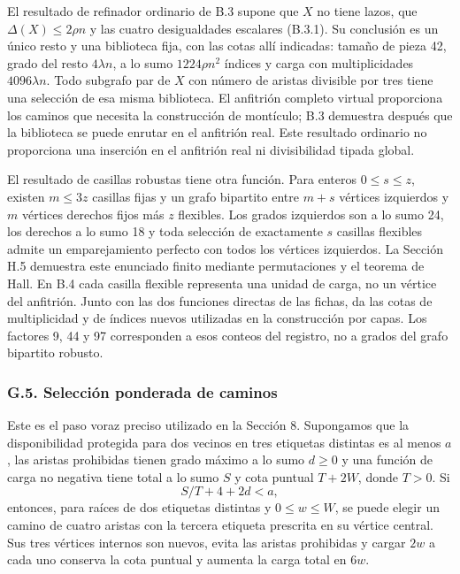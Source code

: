 \documentclass[spanish,11pt,a4paper]{article}
\begin{document}
El resultado de refinador ordinario de B.3 supone que \(X\) no tiene lazos, que \(\Delta(X)\le2\rho n\) y las cuatro desigualdades escalares (B.3.1). Su conclusión es un único resto y una biblioteca fija, con las cotas allí indicadas: tamaño de pieza 42, grado del resto \(4\lambda n\), a lo sumo \(1224\rho n^2\) índices y carga con multiplicidades \(4096\lambda n\). Todo subgrafo par de \(X\) con número de aristas divisible por tres tiene una selección de esa misma biblioteca. El anfitrión completo virtual proporciona los caminos que necesita la construcción de montículo; B.3 demuestra después que la biblioteca se puede enrutar en el anfitrión real. Este resultado ordinario no proporciona una inserción en el anfitrión real ni divisibilidad tipada global.

El resultado de casillas robustas tiene otra función. Para enteros \(0\le s\le z\), existen \(m\le3z\) casillas fijas y un grafo bipartito entre \(m+s\) vértices izquierdos y \(m\) vértices derechos fijos más \(z\) flexibles. Los grados izquierdos son a lo sumo 24, los derechos a lo sumo 18 y toda selección de exactamente \(s\) casillas flexibles admite un emparejamiento perfecto con todos los vértices izquierdos. La Sección H.5 demuestra este enunciado finito mediante permutaciones y el teorema de Hall. En B.4 cada casilla flexible representa una unidad de carga, no un vértice del anfitrión. Junto con las dos funciones directas de las fichas, da las cotas de multiplicidad y de índices nuevos utilizadas en la construcción por capas. Los factores 9, 44 y 97 corresponden a esos conteos del registro, no a grados del grafo bipartito robusto.

\subsubsection{G.5. Selección ponderada de caminos}\label{g.5.-selecciuxf3n-ponderada-de-caminos}

Este es el paso voraz preciso utilizado en la Sección 8. Supongamos que la disponibilidad protegida para dos vecinos en tres etiquetas distintas es al menos \(a\), las aristas prohibidas tienen grado máximo a lo sumo \(d\ge0\) y una función de carga no negativa tiene total a lo sumo \(S\) y cota puntual \(T+2W\), donde \(T>0\). Si \[S/T+4+2d<a,\] entonces, para raíces de dos etiquetas distintas y \(0\le w\le W\), se puede elegir un camino de cuatro aristas con la tercera etiqueta prescrita en su vértice central. Sus tres vértices internos son nuevos, evita las aristas prohibidas y cargar \(2w\) a cada uno conserva la cota puntual y aumenta la carga total en \(6w\).
\end{document}
